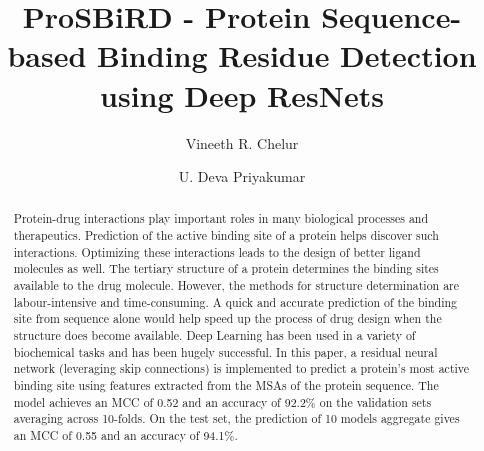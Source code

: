 \documentclass[journal=jacsat,manuscript=article]{achemso}
\author{Vineeth R. Chelur}
\author{U. Deva Priyakumar}
\affiliation[IIIT-H]
{Center for Computational Natural Sciences \& Bioinformatics \\ International Institute of Information Technology \\ Hyderabad - 500032, India}
\title[ProSBiRD - Protein Sequence-based Binding Residue Detection using Deep ResNets]
  {ProSBiRD - Protein Sequence-based Binding Residue Detection using Deep ResNets
  }
\begin{document}






\begin{abstract}
    Protein-drug interactions play important roles in many biological processes and therapeutics. Prediction of the active binding site of a protein helps discover such interactions. Optimizing these interactions leads to the design of better ligand molecules as well. The tertiary structure of a protein determines the binding sites available to the drug molecule. However, the methods for structure determination are labour-intensive and time-consuming. A quick and accurate prediction of the binding site from sequence alone would help speed up the process of drug design when the structure does become available. Deep Learning has been used in a variety of biochemical tasks and has been hugely successful. In this paper, a residual neural network (leveraging skip connections) is implemented to predict a protein's most active binding site using features extracted from the MSAs of the protein sequence. The model achieves an MCC of 0.52 and an accuracy of 92.2\% on the validation sets averaging across 10-folds. On the test set, the prediction of 10 models aggregate gives an MCC of 0.55 and an accuracy of 94.1\%.
\end{abstract}
\end{document}
